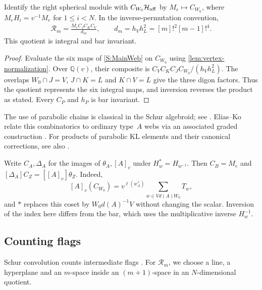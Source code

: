 \documentclass[a4paper,11pt]{amsart}
\numberwithin{equation}{subsection}
\theoremstyle{plain}
\theoremstyle{definition}
\theoremstyle{remark}
\begin{document}
\begin{lemma}\label{lem:main-symmetrizer}
Identify the right spherical module with $C_{W_0}\mathcal H_{\rm aff}$
by $M_e\mapsto C_{W_0}$, where $M_eH_i=v^{-1}M_e$ for $1\le i<N$.
In the inverse-permutation convention,
\begin{gather}\label{eq:marked-symmetrizer}
\mathcal R_m=\frac{M_eC_JC_KC_V}{d_m},\qquad
d_m=h_Vh_L^2=[m]!^2[m-1]!^4.
\end{gather}
This quotient is integral and bar invariant.
\end{lemma}

\begin{proof}
Evaluate the six maps of \autoref{S:MainWeb} on $C_{W_0}$ using
\autoref{lem:vertex-normalization}. Over $\mathbb Q(v)$, their
composite is $C_VC_KC_JC_{W_0}/(h_Vh_L^2)$.
The overlaps $W_0\cap J=V$, $J\cap K=L$ and $K\cap V=L$
give the three digon factors. Thus the quotient represents the
six integral maps, and inversion reverses the product as stated.
Every $C_P$ and $h_P$ is bar invariant.
\end{proof}

\begin{remark}
The use of parabolic chains is classical in the Schur algebroid;
see \cite{Williamson}. Elias--Ko relate this combinatorics
to ordinary type~$A$ webs via an associated graded construction
\cite{EliasKo}.
For products of parabolic KL elements and their canonical
corrections, see also \cite{AgrawalSotirov}.
\end{remark}

Write $C_A,\Delta_A$ for the images of $\theta_A,[A]_v$ under
$H_w^*=H_{w^{-1}}$. Then $C_B=M_e$ and
$[\Delta_A]C_Z=[[A]_v]\theta_Z$. Indeed,
\[
[A]_v(C_{W_0})=v^{\ell(w_A^+)}
\sum_{w\in Vd(A)W_0}T_w,
\]
and $*$ replaces this coset by $W_0d(A)^{-1}V$ without changing
the scalar. Inversion of the index here differs from the bar,
which uses the multiplicative inverse $H_w^{-1}$.

\subsection{Counting flags}

Schur convolution counts intermediate flags \cite{BLM,LusztigAffine}.
For $\mathcal R_m$, we choose a line, a hyperplane and an
$m$-space inside an $(m+1)$-space in an $N$-dimensional quotient.
\end{document}
